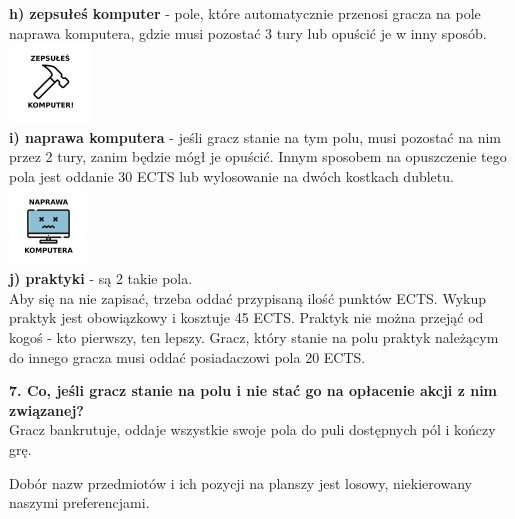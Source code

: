 \documentclass[a4paper]{article}
\begin{document}
\noindent \textbf{h) zepsułeś komputer} - pole, które automatycznie przenosi gracza na pole naprawa komputera, gdzie musi pozostać 3 tury lub opuścić je w inny sposób.\\
\indent\includegraphics[scale=0.8]{jail.png}\\
\noindent \textbf{i) naprawa komputera} - jeśli gracz stanie na tym polu, musi pozostać na nim przez 2 tury, zanim będzie mógł je opuścić. Innym sposobem na opuszczenie tego pola jest oddanie 30 ECTS lub wylosowanie na dwóch kostkach dubletu.\\

\indent\includegraphics[scale=0.8]{injail.png}\\
\noindent \textbf{j) praktyki} - są 2 takie pola.\\
\noindent Aby się na nie zapisać, trzeba oddać przypisaną ilość punktów ECTS. Wykup praktyk jest obowiązkowy i kosztuje 45 ECTS. Praktyk nie można przejąć od kogoś - kto pierwszy, ten lepszy. Gracz, który stanie na polu praktyk należącym do innego gracza musi oddać posiadaczowi pola 20 ECTS.
\vspace{10pt}

\noindent \textbf{7. Co, jeśli gracz stanie na polu i nie stać go na opłacenie akcji z nim związanej?}\\
\noindent Gracz bankrutuje, oddaje wszystkie swoje pola do puli dostępnych pól i kończy grę.
\vspace{10pt}

\noindent Dobór nazw przedmiotów i ich pozycji na planszy jest losowy, niekierowany naszymi preferencjami.
\end{document}
